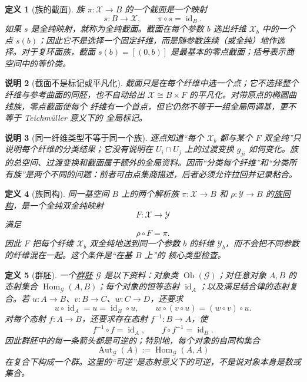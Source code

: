 \documentclass[UTF8,fontset=none,a4paper,11pt]{ctexart}
\theoremstyle{foundation-definition}
\newtheorem{definition}{定义}[section]
\theoremstyle{foundation-theorem}
\theoremstyle{foundation-proposition}
\theoremstyle{foundation-example}
\theoremstyle{foundation-remark}
\newtheorem{remark}[definition]{说明}
\theoremstyle{foundation-theorem}
\newcommand{\term}[2]{\hyperref[#1]{#2}}
\begin{document}
\begin{definition}[族的截面]\label{def:section}
族 \(\pi:\mathcal X\to B\) 的一个截面是一个映射
\[
s:B\longrightarrow\mathcal X,
\qquad \pi\circ s=\operatorname{id}_B.
\]
如果 \(s\) 是全纯映射，就称为全纯截面。截面在每个参数 \(b\) 选出纤维 \(\mathcal X_b\) 中的一个点 \(s(b)\)；因此它不是选择一个固定纤维，而是随参数连续（或全纯）地作选择。对于复环面族，截面 \(s(b)=[(0,b)]\) 是最基本的零点截面；括号表示商空间中的等价类。
\end{definition}

\begin{remark}[截面不是标记或平凡化]
截面只是在每个纤维中选一个点；它不选择整个纤维与参考曲面的同胚，也不自动给出
\(\mathcal X\cong B\times F\) 的平凡化。对带原点的椭圆曲线族，零点截面使每个
纤维有一个首点，但它仍然不等于一组全局同调基，更不等于 Teichmüller 意义下的
全局标记。
\end{remark}

\begin{remark}[同一纤维类型不等于同一个族]
逐点知道“每个 \(\mathcal X_b\) 都与某个 \(F\) 双全纯”只说明每个纤维的分类结果；它没有说明在 \(U_i\cap U_j\) 上的过渡变换 \(g_{ji}\) 如何变化。族的总空间、过渡变换和截面属于额外的全局资料。因而“分类每个纤维”和“分类所有族”是两个不同的问题：前者可由点集商描述，后者必须允许拉回并记录粘合。
\end{remark}

\begin{definition}[族同构]\label{def:family-isomorphism}
同一基空间 \(B\) 上的两个解析族 \(\pi:\mathcal X\to B\) 和
\(\rho:\mathcal Y\to B\) 的\term{def:family-isomorphism}{族同构}，是一个全纯双全纯映射
\[
F:\mathcal X\longrightarrow\mathcal Y
\]
满足
\[
\rho\circ F=\pi.
\]
因此 \(F\) 把每个纤维 \(\mathcal X_b\) 双全纯地送到同一个参数 \(b\) 的纤维
\(\mathcal Y_b\)，而不会把不同参数的纤维混在一起。这个条件是“在基 \(B\) 上”的
核心类型检查。
\end{definition}

\begin{definition}[群胚]\label{def:groupoid}
一个\term{def:groupoid}{群胚} \(\mathcal G\) 是以下资料：对象类
\(\operatorname{Ob}(\mathcal G)\)；对任意对象 \(A,B\) 的态射集合
\(\operatorname{Hom}_{\mathcal G}(A,B)\)；每个对象的恒等态射
\(\operatorname{id}_A\)；以及满足结合律的态射复合。若
\(u:A\to B\)、\(v:B\to C\)、\(w:C\to D\)，还要求
\[
 u\circ\operatorname{id}_A=u=\operatorname{id}_B\circ u,
 \qquad
 w\circ(v\circ u)=(w\circ v)\circ u.
\]
对每个态射
\(f:A\to B\)，还要求存在态射 \(f^{-1}:B\to A\)，使
\[
 f^{-1}\circ f=\operatorname{id}_A,
 \qquad
 f\circ f^{-1}=\operatorname{id}_B.
\]
因此群胚中的每一条箭头都是可逆的；特别地，每个对象的自同构集合
\[
 \operatorname{Aut}_{\mathcal G}(A)
 :=\operatorname{Hom}_{\mathcal G}(A,A)
\]
在复合下构成一个群。这里的“可逆”是态射意义下的可逆，不是说对象本身是数或集合。
\end{definition}
\end{document}
